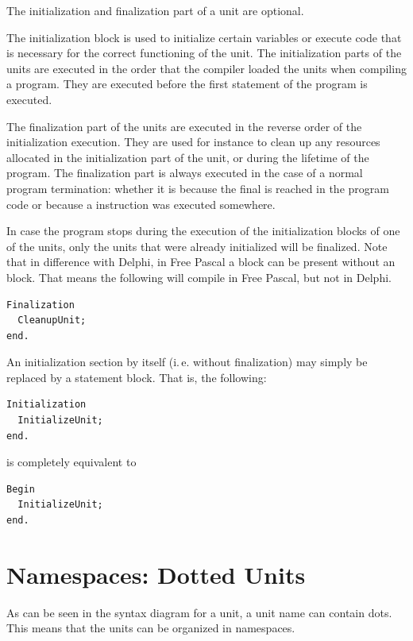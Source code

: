 The initialization and finalization part of a unit are optional.

The initialization block is used to initialize certain variables or
execute code that is necessary for the correct functioning of the unit.
The initialization parts of the units
are executed in the order that the compiler loaded the units when compiling
a program. They are executed before the first statement of the program is
executed.

The finalization part of the units are executed in the reverse order of the
initialization execution. They are used for instance to clean up any resources
allocated in the initialization part  of the unit, or during the lifetime of
the program. The finalization part is always executed in the case of a
normal program termination: whether it is because the final  is
reached in the program code or because a  instruction was executed
somewhere.

In case the program stops during the execution of the initialization blocks
of one of the units, only the units that were already initialized will be
finalized.
Note that in difference with Delphi, in Free Pascal a  block can be
present without an  block. That means the following will
compile in Free Pascal, but not in Delphi.
\begin{verbatim}
Finalization
  CleanupUnit;
end.
\end{verbatim}
An initialization section by itself (i.\,e. without finalization) may simply be
replaced by a statement block. That is, the following:
\begin{verbatim}
Initialization
  InitializeUnit;
end.
\end{verbatim}
is completely equivalent to
\begin{verbatim}
Begin
  InitializeUnit;
end.
\end{verbatim}

\section{Namespaces: Dotted Units}
As can be seen in the syntax diagram for a unit, a unit name can contain dots.
This means that the units can be organized in namespaces.

